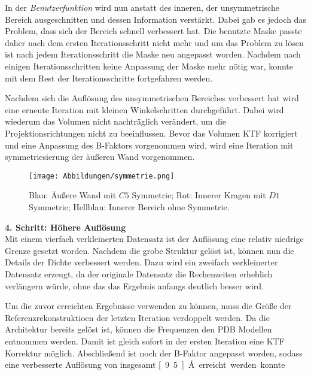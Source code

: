In der \textit{Benutzerfunktion} wird nun anstatt des inneren, der unsymmetrische Bereich ausgeschnitten und dessen Information verstärkt.
Dabei gab es jedoch das Problem, dass sich der Bereich schnell verbessert hat. 
Die benutzte Maske passte daher nach dem ersten Iterationsschritt nicht mehr und um das Problem zu lösen ist nach jedem Iterationsschritt die Maske neu angepasst worden.
Nachdem nach einigen Iterationsschritten keine Anpassung der Maske mehr nötig war, konnte mit dem Rest der Iterationsschritte fortgefahren werden.

Nachdem sich die Auflösung des unsymmetrischen Bereiches verbessert hat wird eine erneute Iteration mit kleinen Winkelschritten durchgeführt.
Dabei wird wiederum das Volumen nicht nachträglich verändert, um die Projektionsrichtungen nicht zu beeinflussen.
Bevor das Volumen KTF korrigiert und eine Anpassung des B-Faktors vorgenommen wird, wird eine Iteration mit symmetriesierung der äußeren Wand vorgenommen.
\\
\begin{wrapfigure}{r}{0.2\textwidth}
	\centering
	\texttt{[image: Abbildungen/symmetrie.png]}
	\caption[Trennenung des Proteins in Bereiche mit verschiedenen Symmetrien]{Blau: Äußere Wand mit $C5$ Symmetrie; Rot: Innerer Kragen mit $D1$ Symmetrie; Hellblau: Innerer Bereich ohne Symmetrie.}
	\label{sym}
\end{wrapfigure}
\textbf{4. Schritt: Höhere Auflösung}\\
Mit einem vierfach verkleinerten Datensatz ist der Auflösung eine relativ niedrige Grenze gesetzt worden.
Nachdem die grobe Struktur gelöst ist, können nun die Details der Dichte verbessert werden.
Dazu wird ein zweifach verkleinerter Datensatz erzeugt, da der originale Datensatz die Rechenzeiten erheblich verlängern würde, ohne das das Ergebnis anfangs deutlich besser wird.

Um die zuvor erreichten Ergebnisse verwenden zu können, muss die Größe der Referenzrekonstruktioen der letzten Iteration verdoppelt werden.
Da die Architektur bereits gelöst ist, können die Frequenzen den PDB Modellen entnommen werden.
Damit ist gleich sofort in der ersten Iteration eine KTF Korrektur möglich.
Abschließend ist noch der B-Faktor angepasst worden, sodass eine verbesserte Auflösung von insgesamt \unit[9.5]{\AA} erreicht werden konnte.
\FloatBarrier 